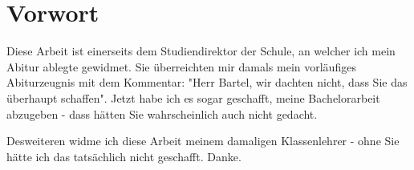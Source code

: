 \section*{Vorwort}

Diese Arbeit ist einerseits dem Studiendirektor der Schule, an welcher ich mein Abitur ablegte gewidmet. Sie überreichten mir damals mein
vorläufiges Abiturzeugnis mit dem Kommentar: "Herr Bartel, wir dachten nicht, dass Sie das überhaupt schaffen". Jetzt habe ich es sogar
geschafft, meine Bachelorarbeit abzugeben -  dass hätten Sie wahrscheinlich auch nicht gedacht.

\smallskip

Desweiteren widme ich diese Arbeit meinem damaligen Klassenlehrer - ohne Sie hätte ich das tatsächlich nicht geschafft. Danke.



